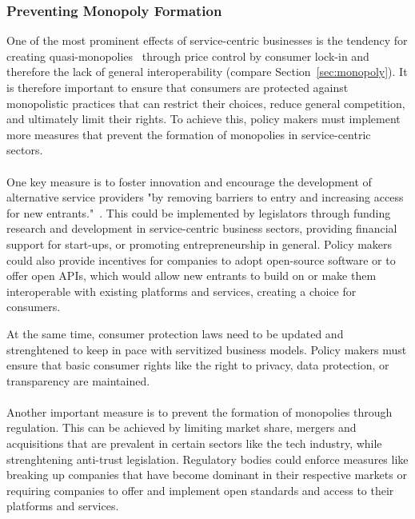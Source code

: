\documentclass[sigplan,screen,nonacm]{acmart}
\begin{document}
\subsubsection{Preventing Monopoly Formation}
One of the most prominent effects of service-centric businesses is the tendency for creating quasi-monopolies~\cite{kreutzmann2022case, gebauer2021digital} through price control by consumer lock-in and therefore the lack of general interoperability (compare Section~\ref{sec:monopoly}).
It is therefore important to ensure that consumers are protected against monopolistic practices that can restrict their choices, reduce general competition, and ultimately limit their rights. 
To achieve this, policy makers must implement more measures that prevent the formation of monopolies in service-centric sectors. 
\\\\
One key measure is to foster innovation and encourage the development of alternative service providers "by removing barriers to entry and increasing access for new entrants."~\cite{kreutzmann2022case}. 
This could be implemented by legislators through funding research and development in service-centric business sectors, 
providing financial support for start-ups, or promoting entrepreneurship in general.
Policy makers could also provide incentives for companies to adopt open-source software or to offer open APIs, which would allow new entrants to build on or make them interoperable with existing platforms and services, creating a choice for consumers.

At the same time, consumer protection laws need to be updated and strenghtened to keep in pace with servitized business models. Policy makers must ensure that basic consumer rights like the right to privacy, data protection, or transparency are maintained. 
\\\\
Another important measure is to prevent the formation of monopolies through regulation.
This can be achieved by limiting market share, mergers and acquisitions that are prevalent in certain sectors like the tech industry, while strenghtening anti-trust legislation.  
Regulatory bodies could enforce measures like breaking up companies that have become dominant in their respective markets or requiring companies to offer and implement open standards and access to their platforms and services. 
\end{document}
